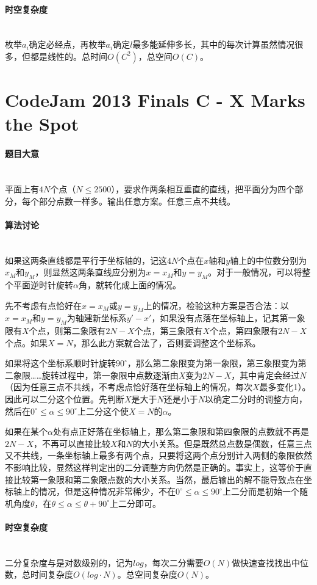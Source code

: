 \documentclass[UTF8]{ctexart}
\newcommand{\myparagraph}[1]{\paragraph{#1}\mbox{}\\}
\theoremstyle{nonumberplain}
\begin{document}
		\myparagraph{时空复杂度}
		
			枚举$a_i$确定必经点，再枚举$a_i$确定$l$最多能延伸多长，其中的每次计算虽然情况很多，但都是线性的。总时间$O(C^2)$，总空间$O(C)$。
	
	\section{CodeJam 2013 Finals C - X Marks the Spot}
	
		\myparagraph{题目大意}
		
			平面上有$4N$个点（$N \leq 2500$），要求作两条相互垂直的直线，把平面分为四个部分，每个部分点数一样多。输出任意方案。任意三点不共线。
		
		\myparagraph{算法讨论}
		
			如果这两条直线都是平行于坐标轴的，记这$4N$个点在$x$轴和$y$轴上的中位数分别为$x_M$和$y_M$，则显然这两条直线应分别为$x=x_M$和$y=y_M$。对于一般情况，可以将整个平面逆时针旋转$\alpha$角，就转化成上面的情况。
			
			先不考虑有点恰好在$x=x_M$或$y=y_M$上的情况，检验这种方案是否合法：以$x=x_M$和$y=y_M$为轴建新坐标系$y'-x'$，如果没有点落在坐标轴上，记其第一象限有$X$个点，则第二象限有$2N-X$个点，第三象限有$X$个点，第四象限有$2N-X$个点。如果$X=N$，那么此方案就合法了，否则要调整这个坐标系。
			
			如果将这个坐标系顺时针旋转$90^\circ$，那么第二象限变为第一象限，第三象限变为第二象限……旋转过程中，第一象限中点数逐渐由$X$变为$2N-X$，其中肯定会经过$N$（因为任意三点不共线，不考虑点恰好落在坐标轴上的情况，每次$X$最多变化1）。因此可以二分这个位置。先判断$X$是大于$N$还是小于$N$以确定二分时的调整方向，然后在$0^\circ \leq \alpha \leq 90^\circ$上二分这个使$X=N$的$\alpha$。
			
			如果在某个$\alpha$处有点正好落在坐标轴上，那么第二象限和第四象限的点数就不再是$2N-X$，不再可以直接比较$X$和$N$的大小关系。但是既然总点数是偶数，任意三点又不共线，一条坐标轴上最多有两个点，只要将这两个点分别计入两侧的象限依然不影响比较，显然这样判定出的二分调整方向仍然是正确的。事实上，这等价于直接比较第一象限和第二象限点数的大小关系。当然，最后输出的解不能导致点在坐标轴上的情况，但是这种情况非常稀少，不在$0^\circ \leq \alpha \leq 90^\circ$上二分而是初始一个随机角度$\theta$，在$\theta \leq \alpha \leq \theta+90^\circ$上二分即可。
		
		\myparagraph{时空复杂度}
		
			二分复杂度与是对数级别的，记为$log$，每次二分需要$O(N)$做快速查找找出中位数，总时间复杂度$O(log \cdot N)$。总空间复杂度$O(N)$。
	
\end{document}

